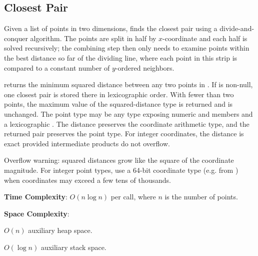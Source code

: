 \subsection{Closest Pair}
\label{sec:7.3.6}
Given a list of points in two dimensions, finds the closest pair using a divide-and-conquer algorithm. The points are split in half by $x$-coordinate and each half is solved recursively; the combining step then only needs to examine points within the best distance so far of the dividing line, where each point in this strip is compared to a constant number of $y$-ordered neighbors.

\begin{compactitem}
  \item {} returns the minimum squared distance between any two points in . If  is non-null, one closest pair is stored there in lexicographic order. With fewer than two points, the maximum value of the squared-distance type is returned and  is unchanged. The point type may be any type exposing numeric  and  members and a lexicographic . The distance preserves the coordinate arithmetic type, and the returned pair preserves the point type. For integer coordinates, the distance is exact provided intermediate products do not overflow.
\end{compactitem}

Overflow warning: squared distances grow like the square of the coordinate magnitude. For integer point types, use a 64-bit coordinate type (e.g.  from ) when coordinates may exceed a few tens of thousands.

\textbf{Time Complexity}: $O(n \log n)$ per call, where $n$ is the number of points.

\textbf{Space Complexity}:
\begin{compactitem}
  \item $O(n)$ auxiliary heap space.
  \item $O(\log n)$ auxiliary stack space.
\end{compactitem}

